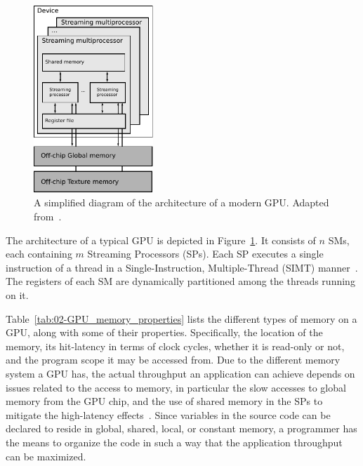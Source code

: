 \begin{figure}
\centering

\includegraphics[width=0.4\textwidth]{02-background_and_motivation/img/GPU_architecture}

\caption{A simplified diagram of the architecture of a modern GPU. Adapted
from~\cite{Ryoo-Optimization_principles_of_a_GPU_using_CUDA:2008}.\label{fig:02-GPU_architecture}}
\end{figure}


The architecture of a typical GPU is depicted in Figure~\ref{fig:02-GPU_architecture}.
It consists of $n$ SMs, each containing $m$ Streaming Processors
(SPs). Each SP executes
a single instruction of a thread in a Single-Instruction, Multiple-Thread
(SIMT)
manner~\cite{Cruz-How_to_obtain_efficient_GPU_kernels:2011}. The
registers of each SM are dynamically partitioned among the threads
running on it. 

Table~\ref{tab:02-GPU_memory_properties} lists the different types
of memory on a GPU, along with some of their properties. Specifically,
the location of the memory, its hit-latency in terms of clock cycles,
whether it is read-only or not, and the program scope it may be accessed
from. Due to the different memory system a GPU has, the actual throughput
an application can achieve depends on issues related to the access
to memory, in particular the slow accesses to global memory from the
GPU chip, and the use of shared memory in the SPs to mitigate the
high-latency effects~\cite{Cruz-How_to_obtain_efficient_GPU_kernels:2011}.
Since variables in the source code can be declared to reside in global,
shared, local, or constant memory, a programmer has the means to organize
the code in such a way that the application throughput can be maximized.

